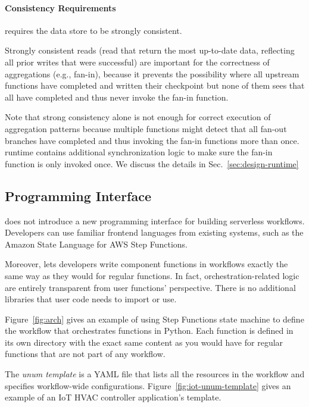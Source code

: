 \paragraph{Consistency Requirements}

\name{} requires the data store to be strongly consistent.

Strongly consistent reads (read that return the most up-to-date data,
reflecting all prior writes that were successful) are important for the
correctness of aggregations (e.g., fan-in), because it prevents the
possibility where all upstream functions have completed and written their
checkpoint but none of them sees that all have completed and thus never invoke
the fan-in function.

Note that strong consistency alone is not enough for correct execution of
aggregation patterns because multiple functions might detect that all fan-out
branches have completed and thus invoking the fan-in functions more than once.
\name{} runtime contains additional synchronization logic to make sure the fan-in
function is only invoked once. We discuss the details in
Sec.~\ref{sec:design-runtime}


\subsection{Programming Interface}

\name{} does not introduce a new programming interface for building serverless
workflows. Developers can use familiar frontend languages from existing
systems, such as the Amazon State Language for AWS Step Functions.

Moreover, \name{} lets developers write component functions in
workflows exactly the same way as they would for regular functions. In fact,
orchestration-related logic are entirely transparent from user functions'
perspective. There is no additional libraries that user code needs to import
or use.

Figure~\ref{fig:arch} gives an example of using Step Functions state machine
to define the workflow that orchestrates functions in Python. Each
function is defined in its own directory with the exact same content as you
would have for regular functions that are not part of any workflow.

The \emph{unum template} is a YAML file that lists all the resources in the
workflow and specifies workflow-wide configurations.
Figure~\ref{fig:iot-unum-template} gives an example of an IoT HVAC controller
application's template.

